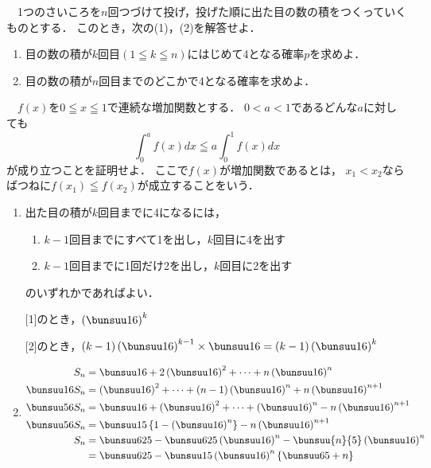 \begin{problem}
  　1つのさいころを$n$回つづけて投げ，投げた順に出た目の数の積をつくっていくものとする．
このとき，次の(1)，(2)を解答せよ．
\begin{enumerate}
\item 目の数の積が$k$回目$(1 \leqq k \leqq n)$にはじめて4となる確率$p$を求めよ．
\item 目の数の積が$n$回目までのどこかで4となる確率を求めよ．
\end{enumerate}

　$f(x)$を$0 \leqq x \leqq 1$で連続な増加関数とする．
$0<a<1$であるどんな$a$に対しても
\[ \int_0^af(x)dx \leqq a\int_0^1f(x)dx \]
が成り立つことを証明せよ．
ここで$f(x)$が増加関数であるとは，
$x_1<x_2$ならばつねに$f(x_1) \leqq f(x_2)$が成立することをいう．
\end{problem}

\begin{enumerate}
  \item 出た目の積が$k$回目までに4になるには，
  \begin{enumerate}
    \item $k-1$回目までにすべて1を出し，$k$回目に4を出す
    \item $k-1$回目までに1回だけ2を出し，$k$回目に2を出す
  \end{enumerate}
  のいずれかであればよい．

  [1]のとき，$\left(\bunsuu16\right)^k$

  [2]のとき，$(k-1)\left(\bunsuu16\right)^{k-1} \times \bunsuu16 = (k-1) \left(\bunsuu16\right)^k$

  \item
  \begin{align*}
    S_n &= \bunsuu16 + 2\left(\bunsuu16 \right)^2 + \cdots + n \left(\bunsuu16\right)^n\\
    \bunsuu16S_n &= \left(\bunsuu16\right)^2 + \cdots + (n-1)\left(\bunsuu16\right)^n + n \left(\bunsuu16\right)^{n+1}\\
    \bunsuu56 S_n &= \bunsuu16 + \left(\bunsuu16\right)^2 + \cdots + \left(\bunsuu16\right)^n - n \left(\bunsuu16\right)^{n+1}\\
    \bunsuu56 S_n &= \bunsuu15 \left\{1-\left(\bunsuu16\right)^n\right\} - n \left(\bunsuu16\right)^{n+1} \\
    S_n &= \bunsuu6{25} - \bunsuu6{25}\left(\bunsuu16\right)^n - \bunsuu{n}{5}\left(\bunsuu16\right)^n\\
    &= \bunsuu6{25} - \bunsuu15\left(\bunsuu16\right)^n \left\{\bunsuu65 + n\right\}
  \end{align*}
\end{enumerate}

